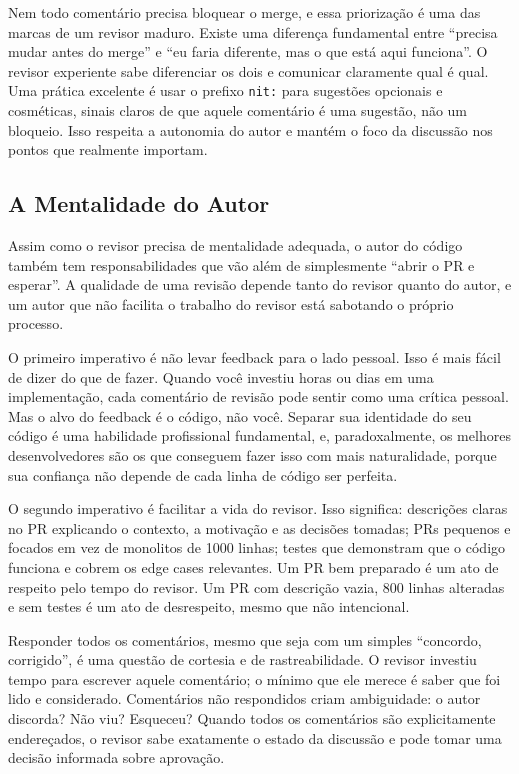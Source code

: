 Nem todo comentário precisa bloquear o merge, e essa priorização é uma das marcas
de um revisor maduro. Existe uma diferença fundamental entre ``precisa mudar antes
do merge'' e ``eu faria diferente, mas o que está aqui funciona''. O revisor
experiente sabe diferenciar os dois e comunicar claramente qual é qual. Uma prática
excelente é usar o prefixo \texttt{nit:} para sugestões opcionais e cosméticas,
sinais claros de que aquele comentário é uma sugestão, não um bloqueio. Isso respeita
a autonomia do autor e mantém o foco da discussão nos pontos que realmente importam.

\subsection{A Mentalidade do Autor}

Assim como o revisor precisa de mentalidade adequada, o autor do código também tem
responsabilidades que vão além de simplesmente ``abrir o PR e esperar''. A qualidade
de uma revisão depende tanto do revisor quanto do autor, e um autor que não facilita
o trabalho do revisor está sabotando o próprio processo.

O primeiro imperativo é não levar feedback para o lado pessoal. Isso é mais fácil
de dizer do que de fazer. Quando você investiu horas ou dias em uma implementação,
cada comentário de revisão pode sentir como uma crítica pessoal. Mas o alvo do
feedback é o código, não você. Separar sua identidade do seu código é uma habilidade
profissional fundamental, e, paradoxalmente, os melhores desenvolvedores são os que
conseguem fazer isso com mais naturalidade, porque sua confiança não depende de cada
linha de código ser perfeita.

O segundo imperativo é facilitar a vida do revisor. Isso significa: descrições
claras no PR explicando o contexto, a motivação e as decisões tomadas; PRs pequenos
e focados em vez de monolitos de 1000 linhas; testes que demonstram que o código
funciona e cobrem os edge cases relevantes. Um PR bem preparado é um ato de respeito
pelo tempo do revisor. Um PR com descrição vazia, 800 linhas alteradas e sem testes
é um ato de desrespeito, mesmo que não intencional.

Responder todos os comentários, mesmo que seja com um simples ``concordo, corrigido'',
é uma questão de cortesia e de rastreabilidade. O revisor investiu tempo para
escrever aquele comentário; o mínimo que ele merece é saber que foi lido e
considerado. Comentários não respondidos criam ambiguidade: o autor discorda? Não viu?
Esqueceu? Quando todos os comentários são explicitamente endereçados, o revisor sabe
exatamente o estado da discussão e pode tomar uma decisão informada sobre aprovação.

